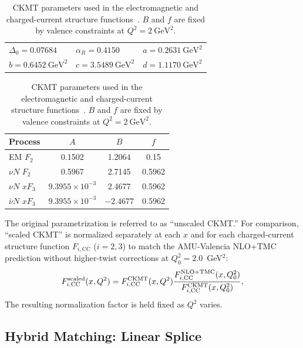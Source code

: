 \documentclass[10pt,twocolumn]{article}
\begin{document}
\begin{table}[t]
  \centering
  \small
  \begin{tabular}{@{}lll@{}}
    \toprule
    $\Delta_0=0.07684$ & $\alpha_R=0.4150$ & $a=0.2631~\mathrm{GeV}^2$\\
    $b=0.6452~\mathrm{GeV}^2$ & $c=3.5489~\mathrm{GeV}^2$ & $d=1.1170~\mathrm{GeV}^2$\\
    \midrule\midrule
  \end{tabular}
  \par
  \begin{tabular}{@{}lccc@{}}
    Process & $A$ & $B$ & $f$\\
    \midrule
    EM $F_2$ & 0.1502 & 1.2064 & 0.15\\
    $\nu N$ $F_2$ & 0.5967 & 2.7145 & 0.5962\\
    $\nu N$ $xF_3$ & $9.3955\times10^{-3}$ & 2.4677 & 0.5962
      \\
    $\bar\nu N$ $xF_3$ & $9.3955\times10^{-3}$ & $-2.4677$ & 0.5962
      \\
    \bottomrule
  \end{tabular}
  \caption{CKMT parameters used in the electromagnetic and charged-current
    structure functions~\cite{RenoCKMT}. $B$ and $f$ are fixed by valence
    constraints at $Q^2=2~\mathrm{GeV}^2$.}
  \label{tab:ckmt-parameters}
\end{table}

The original parametrization is referred to as ``unscaled CKMT.''
For comparison, ``scaled CKMT'' is normalized separately at each $x$
and for each charged-current structure function $F_{i,\mathrm{CC}}$
($i=2,3$) to match the AMU-Valencia NLO+TMC prediction without higher-twist
corrections at $Q^2_0=2.0$~GeV$^2$:
\begin{equation}
  F_{i,\mathrm{CC}}^{\rm scaled}(x,Q^2)
    = F_{i,\mathrm{CC}}^{\rm CKMT}(x,Q^2)
      \frac{F_{i,\mathrm{CC}}^{\rm NLO+TMC}(x,Q^2_0)}
           {F_{i,\mathrm{CC}}^{\rm CKMT}(x,Q^2_0)},
  \label{eq:ckmt-scale}
\end{equation}
The resulting normalization factor is held fixed as $Q^2$ varies.

\subsection{Hybrid Matching: Linear Splice}
\end{document}
